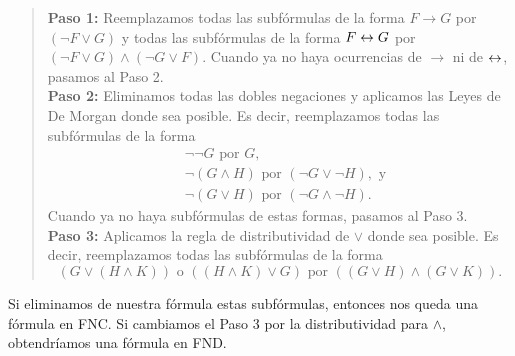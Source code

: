 \message{ !name(main.tex)}\documentclass[12pt,a4paper]{book}
\begin{document}
    \begin{quote}
        \textbf{Paso 1:} Reemplazamos todas las subfórmulas de la forma $F\rightarrow G$ por $(\neg F\vee G)$ y todas las
        subfórmulas de la forma $F\leftrightarrow G$ por $(\neg F\vee G)\wedge(\neg G\vee F)$. Cuando ya no haya ocurrencias de
        $\rightarrow$ ni de $\leftrightarrow$, pasamos al Paso 2.\\[0.2cm]
        \textbf{Paso 2:} Eliminamos todas las dobles negaciones y aplicamos las Leyes de De Morgan donde sea posible. Es
        decir, reemplazamos todas las subfórmulas de la forma
        \begin{align*}
            &\neg\neg G\text{ por }G,\\
            &\neg(G\wedge H)\text{ por }(\neg G\vee\neg H),\text{ y}\\
            &\neg(G\vee H)\text{ por }(\neg G\wedge\neg H).
        \end{align*}
        Cuando ya no haya subfórmulas de estas formas, pasamos al Paso 3.\\[0.2cm]
        \textbf{Paso 3:} Aplicamos la regla de distributividad de $\vee$ donde sea posible. Es decir, reemplazamos todas las
        subfórmulas de la forma
        \begin{equation*}
            (G\vee(H\wedge K))\text{ o }((H\wedge K)\vee G)\text{ por }((G\vee H)\wedge(G\vee K)).
        \end{equation*}
    \end{quote}

    Si eliminamos de nuestra fórmula estas subfórmulas, entonces nos queda una fórmula en FNC. Si cambiamos el Paso 3 por la
    distributividad para $\wedge$, obtendríamos una fórmula en FND.
\end{document}
